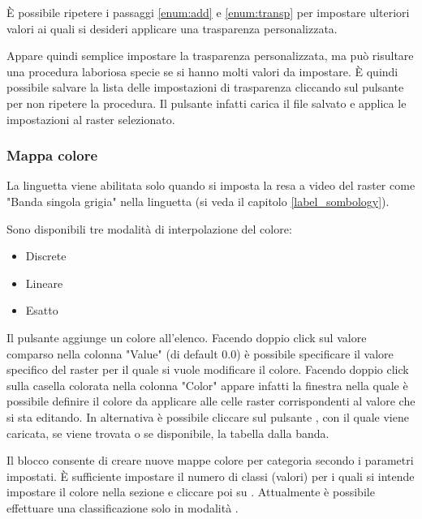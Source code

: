 È possibile ripetere i passaggi \ref{enum:add} e \ref{enum:transp} per
impostare ulteriori valori ai quali si desideri applicare una trasparenza
personalizzata.

Appare quindi semplice impostare la trasparenza personalizzata, ma può
risultare una procedura laboriosa specie se si hanno molti valori da
impostare. È quindi possibile salvare la lista delle impostazioni di
trasparenza cliccando sul pulsante  per non ripetere la procedura. Il pulsante
 infatti carica il file
salvato e applica le impostazioni al raster selezionato.

\subsubsection{Mappa colore} \label{label_colormaptab}

La linguetta  viene abilitata solo quando si imposta la resa
a video del raster come "Banda singola grigia" nella linguetta
 (si veda il capitolo \ref{label_sombology}).

Sono disponibili tre modalità di interpolazione del colore:
\begin{itemize}
\item Discrete
\item Lineare
\item Esatto
\end{itemize}

Il pulsante  aggiunge un colore all'elenco.
Facendo doppio click sul valore comparso nella colonna "Value" (di default
0.0) è possibile specificare il valore specifico del raster per il quale si
vuole modificare il colore.
Facendo doppio click sulla casella colorata nella colonna "Color" appare
infatti la finestra   nella quale è possibile definire il
colore da applicare alle celle raster corrispondenti al valore che si sta editando.
In alternativa è possibile cliccare sul pulsante
, con il
quale viene caricata, se viene trovata o se disponibile, la tabella dalla banda.

Il blocco  consente di creare nuove
mappe colore per categoria secondo i parametri impostati. È sufficiente
impostare il numero di classi (valori) per i quali si intende impostare il
colore nella sezione  e cliccare poi su
. Attualmente è possibile effettuare una classificazione
solo in modalità .

